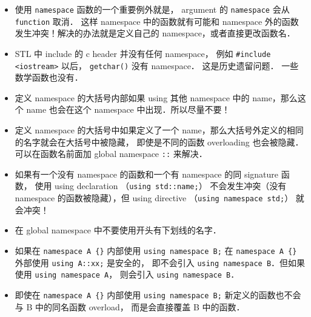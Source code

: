 
\begin{issues}
\issueDraft
\end{issues}

\begin{itemize}
\item 使用 \verb|namespace| 函数的一个重要例外就是， argument 的 \verb|namespace| 会从 \verb|function| 取消． 这样 namespace 中的函数就有可能和 namespace 外的函数发生冲突！解决的办法就是定义自己的 namespace，或者直接更改函数名．
\item STL 中 include 的 c header 并没有任何 namespace， 例如 \verb|#include <iostream>| 以后， \verb|getchar()| 没有 namespace． 这是历史遗留问题． 一些数学函数也没有．
\item 定义 namespace 的大括号内部如果 using 其他 namespace 中的 name，那么这个 name 也会在这个 namespace 中出现．所以尽量不要！
\item 定义 namespace 的大括号中如果定义了一个 name，那么大括号外定义的相同的名字就会在大括号中被隐藏， 即使是不同的函数 overloading 也会被隐藏． 可以在函数名前面加 global namespace \verb|::| 来解决．
\item 如果有一个没有 namespace 的函数和一个有 namespace 的同 signature 函数， 使用 using declaration （\verb|using std::name;|） 不会发生冲突（没有 namespace 的函数被隐藏），但 using directive （\verb|using namespace std;|） 就会冲突！
\item 在 global namespace 中不要使用开头有下划线的名字．
\item 如果在 \verb|namespace A {}| 内部使用 \verb|using namespace B;| 在 \verb|namespace A {}| 外部使用 \verb|using A::xx;| 是安全的， 即不会引入 \verb|using namespace B|．但如果使用 \verb|using namespace A|， 则会引入 \verb|using namespace B|．
\item 即使在 \verb|namespace A {}| 内部使用 \verb|using namespace B;|  新定义的函数也不会与 B 中的同名函数 overload， 而是会直接覆盖 B 中的函数．
\end{itemize}
